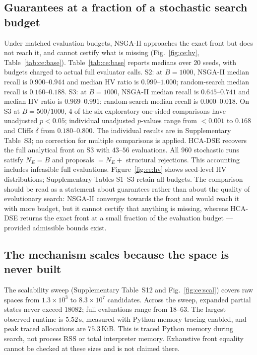 \documentclass[pdflatex,sn-nature,lineno]{sn-jnl}
\newcommand{\SthreeEvalRange}{43\text{--}56}
\newcommand{\RefBaselinesTab}{Table~\ref{tab:ce:base}}
\newcommand{\RefStatsTab}{Supplementary Table~S3}
\newcommand{\RefHvFig}{Figure~\ref{fig:ce:hv}}
\newcommand{\RefScalSite}{Supplementary Table~S12 and Fig.~\ref{fig:ce:scal}}
\begin{document}
\subsection{Guarantees at a fraction of a stochastic search budget}
Under matched evaluation budgets, NSGA-II approaches the exact front but does not reach
it, and cannot certify what is missing (Fig.~\ref{fig:ce:hv}, Table~\ref{tab:ce:base}).
%
\RefBaselinesTab{} reports medians over 20 seeds, with budgets charged to actual full evaluator calls. S2: at $B=1000$, NSGA-II median recall is $0.900\text{--}0.944$ and median HV ratio is $0.999\text{--}1.000$; random-search median recall is $0.160\text{--}0.188$.
S3: at $B=1000$, NSGA-II median recall is $0.645\text{--}0.741$ and median HV ratio is $0.969\text{--}0.991$; random-search median recall is $0.000\text{--}0.018$.
On S3 at $B=500/1000$, 4 of the six exploratory one-sided comparisons have unadjusted $p<0.05$; individual unadjusted $p$-values range from $<0.001$ to $0.168$ and Cliff\textquotesingle{}s $\delta$ from $0.180\text{--}0.800$. The individual results are in \RefStatsTab{}; no correction for multiple comparisons is applied. HCA-DSE recovers the full analytical front on S3 with $\SthreeEvalRange$ evaluations.
All 960 stochastic runs satisfy $N_E=B$ and proposals $=N_E+$ structural rejections.
This accounting includes infeasible full evaluations. \RefHvFig{} shows
seed-level HV distributions; Supplementary Tables S1--S3 retain all budgets.
The comparison should be read as a statement about guarantees rather than about the
quality of evolutionary search: NSGA-II converges towards the front and would reach it
with more budget, but it cannot certify that anything is missing, whereas HCA-DSE returns
the exact front at a small fraction of the evaluation budget --- provided admissible
bounds exist.

\subsection{The mechanism scales because the space is never built}
%
The scalability sweep (\RefScalSite{}) covers raw spaces from $1.3\times10^3$ to $8.3\times10^7$ candidates. Across the sweep, expanded partial states never exceed $18082$; full evaluations range from $18\text{--}63$. The largest observed runtime is $5.52$\,s, measured with Python memory tracing enabled, and peak traced allocations are $75.3$\,KiB. This is traced Python memory during search, not process RSS or total interpreter memory.
Exhaustive front equality cannot be checked at these sizes and is not claimed there.
\end{document}
